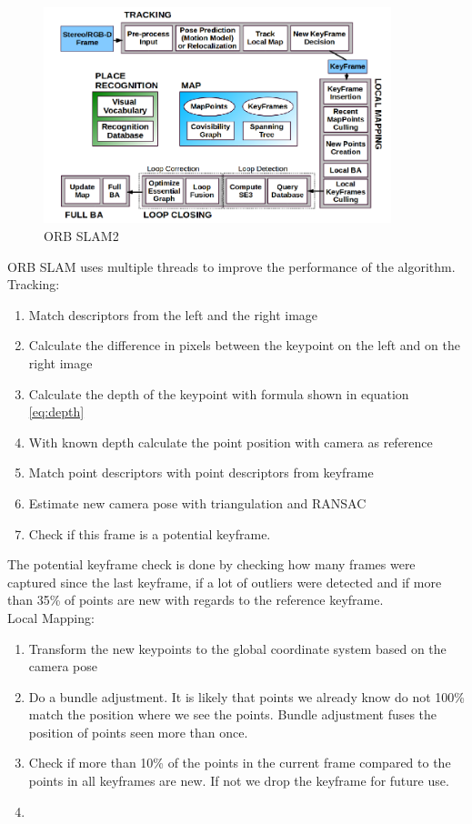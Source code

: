\documentclass[11pt,a4paper,titlepage,oneside]{report}
\begin{document}
\begin{figure}[H]
  \begin{center}
		\includegraphics[width=0.9\textwidth]{img/orb_slam2.png}
  \end{center}
	\caption{ORB SLAM2 \cite{orbslam2}}\label{fig:orb_slam2}
\end{figure}

ORB SLAM uses multiple threads to improve the performance of the algorithm. \\
Tracking:
\begin{enumerate}
	\item Match descriptors from the left and the right image
	\item Calculate the difference in pixels between the keypoint on the left and on the right image
	\item Calculate the depth of the keypoint with formula shown in equation \ref{eq:depth}
	\item With known depth calculate the point position with camera as reference
	\item Match point descriptors with point descriptors from keyframe
	\item Estimate new camera pose with triangulation and RANSAC
	\item Check if this frame is a potential keyframe.
\end{enumerate}
The potential keyframe check is done by checking how many frames were captured since the last keyframe, if a lot of outliers were detected and if more than 35\% of points are new with regards to the reference keyframe.\\

Local Mapping:
\begin{enumerate}
	\item Transform the new keypoints to the global coordinate system based on the camera pose
	\item Do a bundle adjustment. It is likely that points we already know do not 100\% match the position where we see the points. Bundle adjustment fuses the position of points seen more than once.
	\item Check if more than 10\% of the points in the current frame compared to the points in all keyframes are new. If not we drop the keyframe for future use.
	\item 
\end{enumerate}
\end{document}
